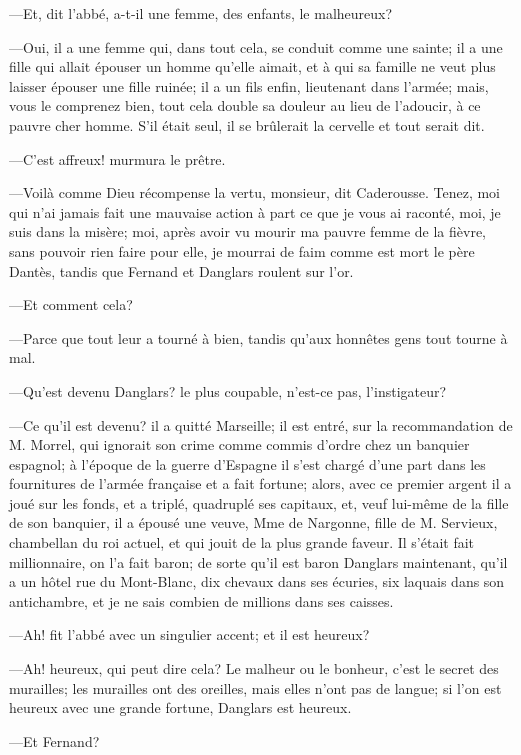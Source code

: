 —Et, dit l'abbé, a-t-il une femme, des enfants, le malheureux?

—Oui, il a une femme qui, dans tout cela, se conduit comme une sainte; il a une fille qui allait épouser un homme qu'elle aimait, et à qui sa famille ne veut plus laisser épouser une fille ruinée; il a un fils enfin, lieutenant dans l'armée; mais, vous le comprenez bien, tout cela double sa douleur au lieu de l'adoucir, à ce pauvre cher homme. S'il était seul, il se brûlerait la cervelle et tout serait dit.

—C'est affreux! murmura le prêtre.

—Voilà comme Dieu récompense la vertu, monsieur, dit Caderousse. Tenez, moi qui n'ai jamais fait une mauvaise action à part ce que je vous ai raconté, moi, je suis dans la misère; moi, après avoir vu mourir ma pauvre femme de la fièvre, sans pouvoir rien faire pour elle, je mourrai de faim comme est mort le père Dantès, tandis que Fernand et Danglars roulent sur l'or.

—Et comment cela?

—Parce que tout leur a tourné à bien, tandis qu'aux honnêtes gens tout tourne à mal.

—Qu'est devenu Danglars? le plus coupable, n'est-ce pas, l'instigateur?

—Ce qu'il est devenu? il a quitté Marseille; il est entré, sur la recommandation de M. Morrel, qui ignorait son crime comme commis d'ordre chez un banquier espagnol; à l'époque de la guerre d'Espagne il s'est chargé d'une part dans les fournitures de l'armée française et a fait fortune; alors, avec ce premier argent il a joué sur les fonds, et a triplé, quadruplé ses capitaux, et, veuf lui-même de la fille de son banquier, il a épousé une veuve, Mme de Nargonne, fille de M. Servieux, chambellan du roi actuel, et qui jouit de la plus grande faveur. Il s'était fait millionnaire, on l'a fait baron; de sorte qu'il est baron Danglars maintenant, qu'il a un hôtel rue du Mont-Blanc, dix chevaux dans ses écuries, six laquais dans son antichambre, et je ne sais combien de millions dans ses caisses.

—Ah! fit l'abbé avec un singulier accent; et il est heureux?

—Ah! heureux, qui peut dire cela? Le malheur ou le bonheur, c'est le secret des murailles; les murailles ont des oreilles, mais elles n'ont pas de langue; si l'on est heureux avec une grande fortune, Danglars est heureux.

—Et Fernand?

